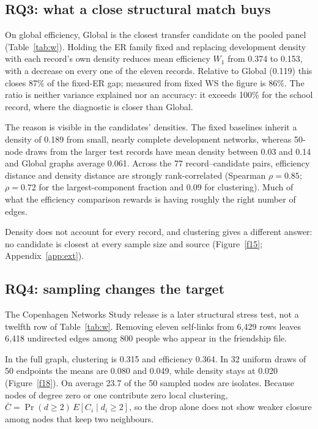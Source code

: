 \documentclass{article}
\begin{document}
\subsection{RQ3: what a close structural match buys}\label{sec:density}
On global efficiency, Global is the closest transfer candidate on the pooled panel (Table~\ref{tab:w}). Holding the ER family fixed and replacing development density with each record's own density reduces mean efficiency $W_1$ from 0.374 to 0.153, with a decrease on every one of the eleven records. Relative to Global (0.119) this closes 87\% of the fixed-ER gap; measured from fixed WS the figure is 86\%. The ratio is neither variance explained nor an accuracy: it exceeds 100\% for the school record, where the diagnostic is closer than Global.

The reason is visible in the candidates' densities. The fixed baselines inherit a density of 0.189 from small, nearly complete development networks, whereas 50-node draws from the larger test records have mean density between 0.03 and 0.14 and Global graphs average 0.061. Across the 77 record--candidate pairs, efficiency distance and density distance are strongly rank-correlated (Spearman $\rho=0.85$; $\rho=0.72$ for the largest-component fraction and $0.09$ for clustering). Much of what the efficiency comparison rewards is having roughly the right number of edges.

Density does not account for every record, and clustering gives a different answer: no candidate is closest at every sample size and source (Figure~\ref{f15}; Appendix~\ref{app:ext}).

\subsection{RQ4: sampling changes the target}\label{sec:cns}
The Copenhagen Networks Study release \citep{cns} is a later structural stress test, not a twelfth row of Table~\ref{tab:w}. Removing eleven self-links from 6,429 rows leaves 6,418 undirected edges among 800 people who appear in the friendship file.

In the full graph, clustering is 0.315 and efficiency 0.364. In 32 uniform draws of 50 endpoints the means are 0.080 and 0.049, while density stays at 0.020 (Figure~\ref{f18}). On average 23.7 of the 50 sampled nodes are isolates. Because nodes of degree zero or one contribute zero local clustering, $\bar C=\Pr(d\ge2)\,E[C_i\mid d_i\ge2]$, so the drop alone does not show weaker closure among nodes that keep two neighbours.
\end{document}
